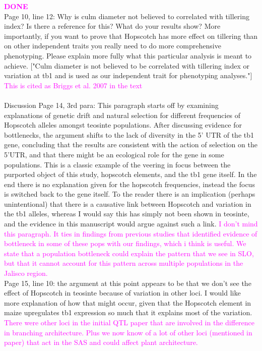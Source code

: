 \documentclass[11pt]{article}
\newcommand{\lev}[1]{\noindent \textcolor{magenta}{{#1}} \\}
\begin{document}
\lev{\bf{DONE}} Page 10, line 12: Why is culm diameter not believed to correlated with tillering index?  Is there a reference for this? What do your results show?  More importantly, if you want to prove that Hopscotch has more effect on tillering than on other independent traits you really need to do more comprehensive phenotyping.  Please explain more fully what this particular analysis is meant to achieve.
["Culm diameter is not believed to be correlated with tillering index or variation at tb1 and is used as our independent trait for phenotyping analyses."]
\lev{This is cited as Briggs et al. 2007 in the text}\\
Discussion
Page 14, 3rd para: This paragraph starts off by examining explanations of genetic drift and natural selection for different frequencies of Hopscotch alleles amongst teosinte populations.  After discussing evidence for bottlenecks, the argument shifts to the lack of diversity in the 5' UTR of the tb1 gene, concluding that the results are consistent with the action of selection on the 5'UTR, and that there might be an ecological role for the gene in some populations.  This is a classic example of the veering in focus between the purported object of this study, hopscotch elements, and the tb1 gene itself.  In the end there is no explanation given for the hopscotch frequencies, instead the focus is switched back to the gene itself.  To the reader there is an implication (perhaps unintentional) that there is a causative link between Hopscotch and variation in the tb1 alleles, whereas I would say this has simply not been shown in teosinte, and the evidence in this manuscript would
argue against such a link.
\lev{I don't mind this paragraph. It ties in findings from previous studies that identified evidence of bottleneck in some of these pops with our findings, which i think is useful. We state that a population bottleneck could explain the pattern that we see in SLO, but that it cannot account for this pattern across multiple populations in the Jalisco region.}

Page 15, line 10: the argument at this point appears to be that we don't see the effect of Hopscotch in teosinte because of variation in other loci.  I would like more explanation of how that might occur, given that the Hopscotch element in maize upregulates tb1 expression so much that it explains most of the variation.  
\lev{There were other loci in the initial QTL paper that are involved in the difference in branching architecture. Plus we now know of a lot of other loci (mentioned in paper) that act in the SAS and could affect plant architecture.}
\end{document}
